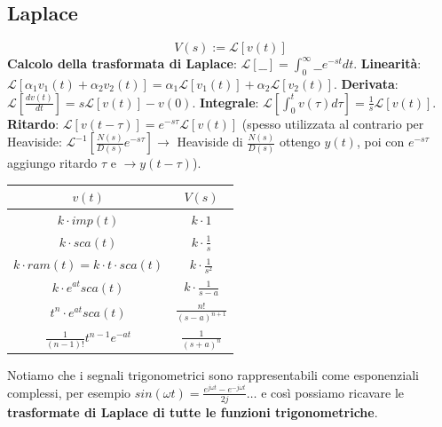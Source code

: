     \subsection{Laplace}
    \[
        V(s) := \mathcal{L}[v(t)]
    \]
    \textbf{Calcolo della trasformata di Laplace}: $\mathcal{L}[\_\_] =  \int_{0}^{\infty}\_\_ e^{-st} dt$.\newline
    \textbf{Linearità}: $\mathcal{L}[\alpha_1 v_1(t) + \alpha_2 v_2(t)] = \alpha_1 \mathcal{L}[v_1(t)] + \alpha_2 \mathcal{L}[v_2(t)]$.\newline
    \textbf{Derivata}: $\mathcal{L}\left[ \frac{d v(t)}{dt} \right] = s \mathcal{L}[v(t)] - v(0)$.\newline
    \textbf{Integrale}: $\mathcal{L}\left[ \int_{0}^{t} v(\tau) d \tau \right] = \frac{1}{s} \mathcal{L}[v(t)]$.\newline
    \textbf{Ritardo}: $ \mathcal{L}[ v(t - \tau)] = e^{-s \tau} \mathcal{L}[v(t)]$ (spesso utilizzata al contrario per Heaviside: $\mathcal{L}^{-1}\left[\frac{N(s)}{D(s)}e^{-s \tau}\right] \rightarrow $ Heaviside di $\frac{N(s)}{D(s)}$ ottengo $y(t)$, poi con $e^{-s \tau}$ aggiungo ritardo $\tau$ e $\rightarrow  y(t- \tau)$).\newline
    \renewcommand{\arraystretch}{2}
    \begin{center}
        \begin{tabular}{ |c|c| } 
        \hline
        \;\;\;\;\;\;\;\;\;\;\;\;\;\;\;$v(t)$ \;\;\;\;\;\;\;\;\;\;\;\;\;\;\;& \;\;\;\;\;\;\;\;\;\;\;\;\;\;\;$V(s)$ \;\;\;\;\;\;\;\;\;\;\;\;\;\;\;\\ 
        \hline
        $k \cdot imp(t)$ & $k \cdot 1$ \\ 
        $k \cdot sca(t)$ & $k \cdot \frac{1}{s}$  \\ 
        $k \cdot ram(t) =k \cdot t \cdot  sca(t)$ & $k \cdot \frac{1}{s^2}$ \\
        $k \cdot e^{at}sca(t)$ & $k \cdot \frac{1}{s-a}$ \\ 
        $t^{n}\cdot e^{at}sca(t)$ & $\frac{n!}{(s-a)^{n+1}}$\\ 
        $\frac{1}{(n-1)!} t^{n-1}e^{-at}$ & $\frac{1}{(s+a)^n}$\\
        \hline
        \end{tabular}
    \end{center}
    \renewcommand{\arraystretch}{1}
    Notiamo che i segnali trigonometrici sono rappresentabili come esponenziali complessi, per esempio $sin(\omega t) = \frac{e^{j \omega t}- e^{-j \omega t}}{2j} \dots$ e così possiamo ricavare le \textbf{trasformate di Laplace di tutte le funzioni trigonometriche}.\newline

